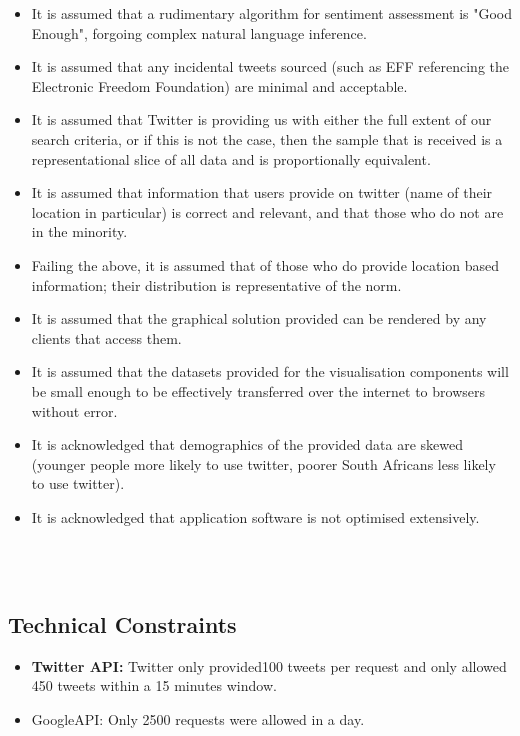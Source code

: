 \documentclass[12pt]{article} %
\begin{document}
\begin{itemize}
	
	
	\item It is assumed that a rudimentary algorithm for sentiment assessment is "Good Enough", forgoing complex natural language inference. 
	
	\item It is assumed that any incidental tweets sourced (such as EFF referencing the Electronic Freedom Foundation) are minimal and acceptable.
	
	\item It is assumed that Twitter is providing us with either the full extent of our search criteria, or if this is not the case, then the sample that is received is a representational slice of all data and is proportionally equivalent.
	
	\item It is assumed that information that users provide on twitter (name of their location in particular) is correct and relevant, and that those who do not are in the minority.
	
	\item Failing the above, it is assumed that of those who do provide location based information; their distribution is representative of the norm.
	
	\item It is assumed that the graphical solution provided can be rendered by any clients that access them.
	
	\item It is assumed that the datasets provided for the visualisation components will be small enough to be effectively transferred over the internet to browsers without error.
	
	\item It is acknowledged that demographics of the provided data are skewed (younger people more likely to use twitter, poorer South Africans less likely to use twitter).
	
	\item It is acknowledged that application software is not optimised extensively.
\end{itemize}
	\
	\\
	\
\subsection {Technical Constraints}

\begin{itemize}
	\item \textbf{Twitter API:} Twitter only provided100 tweets per request and only allowed 450 tweets within a 15 minutes window.
	\item GoogleAPI: Only 2500 requests were allowed in a day.
\end{itemize}
\end{document}
